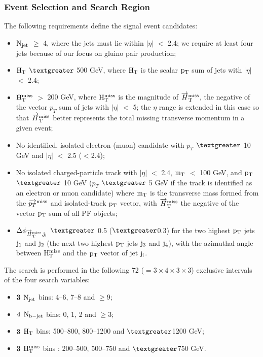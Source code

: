 \subsubsection{Event Selection and Search Region}  
The following requirements define the  signal event candidates:
\begin{itemize}
\item $\rm N_{jet}$ $\geq$ 4, where the jets must lie within $|\eta|$ $<$ 2.4; we require at least four jets because of
our focus on gluino pair production;
\item $\rm H_{T}$ $\textgreater $ 500 GeV, where $\rm H_{T}$ is the scalar $\rm p_{T}$ sum of jets with $|\eta|$ $<$ 2.4;

\item $\rm H_{T}^{miss}$ $>$ 200 GeV, where $\rm H_{T}^{miss}$ is the magnitude of $\rm \overrightarrow{H}_{T}^{miss}$, the negative of the vector
$p_{T}$ sum of jets with $|\eta|$ $<$ 5; the $\eta$ range is extended in this case so that  ${\rm \overrightarrow{H}_{T}^{miss}}$ better
represents the total missing transverse momentum in a given event;

\item  No identified, isolated electron (muon) candidate with $p_{T}$ $\textgreater$ 10 GeV and $|\eta|$ $<$ 2.5 ($<$2.4);

\item No isolated charged-particle track with $|\eta|$ $<$  2.4, $\rm m_{T}$ $<$ 100 GeV, and $\rm p_{T}$ $\textgreater $ 10 GeV
($p_{T}$ $\textgreater$ 5 GeV if the track is identified as an electron or muon candidate) where $\rm m_{T}$ is the transverse mass formed from the ${\rm \overrightarrow{p_{T}}^{miss}}$ and isolated-track
$\rm p_{T}$ vector, with ${\rm \overrightarrow{H}_{T}^{miss}}$ the negative of the vector  $\rm p_{T}$ sum of all PF objects;

\item  $\Delta \phi_{\rm \overrightarrow{H}_{T}^{miss},j_{i}}$  $\textgreater$ 0.5 ($\textgreater$0.3) for the two highest $\rm p_{T}$ jets $\rm j_{1}$ and $\rm j_{2}$ (the next two highest $\rm p_{T}$ jets
$\rm j_{3}$ and $\rm j_{4}$), with   the azimuthal angle between $\rm H_{T}^{miss}$ and the $\rm p_{T}$ vector of jet $\rm j_{i}$.

\end{itemize}
The search is performed in the following 72 ($=3\times4\times3\times3$) exclusive intervals of the four search variables:
\begin{itemize}

 \item ${\bf 3 }$ $\rm N_{jet}$ bins: 4$–$6, 7$–$8 and $\geq$9;
 \item ${\bf 4 }$ $\rm N_{b-jet}$ bins: 0, 1, 2 and $\geq$3;
 \item ${\bf 3 }$ $\rm H_{T}$ bins: 500$–$800, 800$–$1200 and $\textgreater$1200 GeV;
 \item ${\bf 3 }$ $\rm H_{T}^{miss}$ bins : 200$–$500, 500$–$750 and $\textgreater$750 GeV.
\end{itemize}

